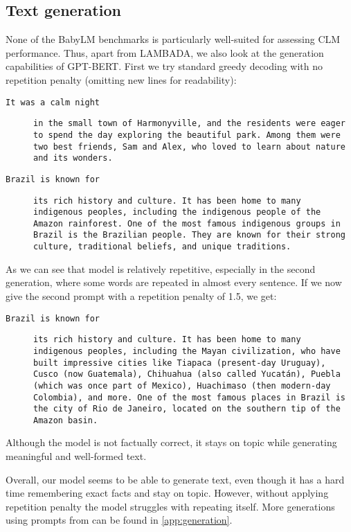 \subsection{Text generation}
\label{sec:generation}

None of the BabyLM benchmarks is particularly well-suited for assessing CLM performance. Thus, apart from LAMBADA, we also look at the generation capabilities of \textsc{GPT-BERT}. First we try standard greedy decoding with no repetition penalty (omitting new lines for readability):

{\small
\begin{description}
    \item[\texttt{It was a calm night}]\texttt{in the small town of Harmonyville, and the residents were eager to spend the day exploring the beautiful park. Among them were two best friends, Sam and Alex, who loved to learn about nature and its wonders.}
    \item[\texttt{Brazil is known for}]\texttt{its rich history and culture. It has been home to many indigenous peoples, including the indigenous people of the Amazon rainforest. One of the most famous indigenous groups in Brazil is the Brazilian people. They are known for their strong culture, traditional beliefs, and unique traditions.}
\end{description}
}

\noindent
As we can see that model is relatively repetitive, especially in the second generation, where some words are repeated in almost every sentence. If we now give the second prompt with a repetition penalty of 1.5, we get:

{\small
\begin{description}
    \item[\texttt{Brazil is known for}] \texttt{its rich history and culture. It has been home to many indigenous peoples, including the Mayan civilization, who have built impressive cities like Tiapaca (present-day Uruguay), Cusco (now Guatemala), Chihuahua (also called Yucatán), Puebla (which was once part of Mexico), Huachimaso (then modern-day Colombia), and more. One of the most famous places in Brazil is the city of Rio de Janeiro, located on the southern tip of the Amazon basin.}
\end{description}
}

\noindent
Although the model is not factually correct, it stays on topic while generating meaningful and well-formed text.

Overall, our model seems to be able to generate text, even though it has a hard time remembering exact facts and stay on topic. However, without applying repetition penalty the model struggles with repeating itself. More generations using prompts from \citet{radford2019language} can be found in \cref{app:generation}.

